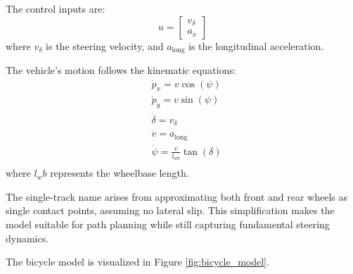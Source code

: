 The control inputs are:
\begin{equation}
	u = \begin{bmatrix} v_{\delta} \\ a_{x} \end{bmatrix}
	\label{eq:controls_kst}
\end{equation}
where $v_{\delta}$ is the steering velocity, and $a_{\text{long}}$ is the longitudinal acceleration.

The vehicle's motion follows the kinematic equations:
\begin{align}
	 & \dot{p}_x = v\cos(\psi)                                                   \\
	 & \dot{p}_y = v\sin(\psi)                                                   \\
	 & \dot{\delta} = v_{\delta}                                                 \\
	 & \dot{v} = a_{\text{long}}                                                 \\
	 & \dot{\psi} = \frac{v}{l_{wb}} \tan(\delta) \label{eq:dpsi_steering_angle} \\
\end{align}
where $l_wb$ represents the wheelbase length.

The single-track name arises from approximating both front and rear wheels as single contact points, assuming no lateral slip.
This simplification makes the model suitable for path planning while still capturing fundamental steering dynamics.

The bicycle model is visualized in Figure \ref{fig:bicycle_model}.

